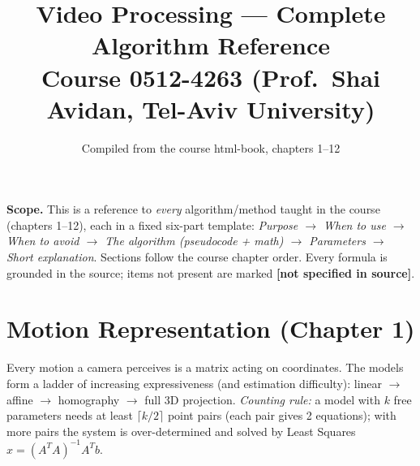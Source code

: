 \documentclass[10pt]{article}
\title{\vspace{-1.3cm}\textbf{Video Processing --- Complete Algorithm Reference}\\[2mm]
\large Course 0512-4263 \; (Prof.\ Shai Avidan, Tel-Aviv University)}
\author{}
\date{Compiled from the course html-book, chapters 1--12}
\begin{document}
\maketitle
\vspace{-0.8cm}

\begin{notebox}
\textbf{Scope.} This is a reference to \emph{every} algorithm/method taught in the course
(chapters 1--12), each in a fixed six-part template: \emph{Purpose $\to$ When to use $\to$ When to
avoid $\to$ The algorithm (pseudocode + math) $\to$ Parameters $\to$ Short explanation}. Sections follow
the course chapter order. Every formula is grounded in the source; items not present are marked
\textbf{[not specified in source]}.
\end{notebox}

\tableofcontents

\newpage
\section{Motion Representation (Chapter 1)}
Every motion a camera perceives is a matrix acting on coordinates. The models form a ladder of
increasing expressiveness (and estimation difficulty): linear $\to$ affine $\to$ homography $\to$ full
3D projection. \emph{Counting rule:} a model with $k$ free parameters needs at least $\lceil k/2\rceil$
point pairs (each pair gives 2 equations); with more pairs the system is over-determined and solved by
Least Squares $x=(A^TA)^{-1}A^Tb$.

\end{document}
